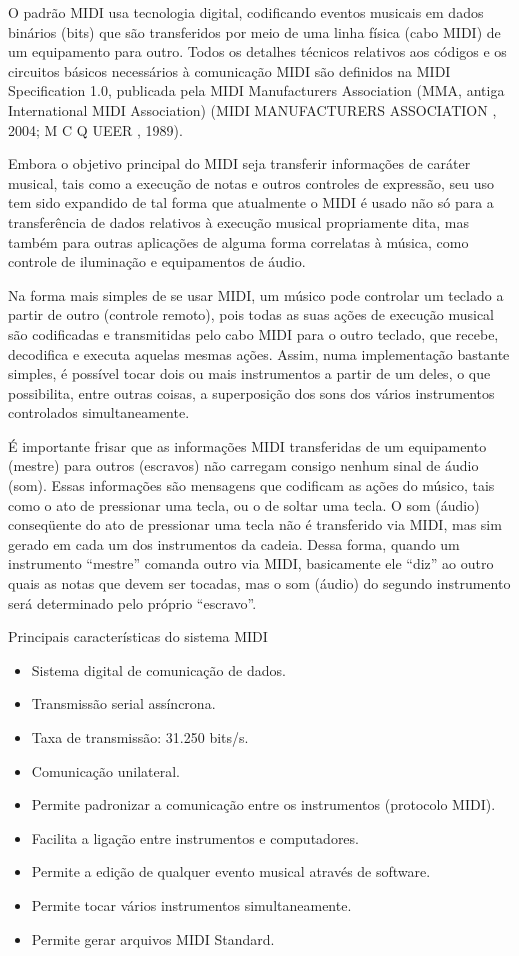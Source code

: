 O padrão MIDI usa tecnologia digital, codificando eventos musicais em dados binários (bits) que são transferidos por meio de uma linha física (cabo MIDI) de um equipamento para outro. Todos os detalhes técnicos relativos aos códigos e os circuitos básicos necessários à comunicação MIDI são definidos na MIDI Specification 1.0, publicada pela MIDI Manufacturers Association (MMA, antiga International MIDI Association) (MIDI MANUFACTURERS ASSOCIATION , 2004; M C Q UEER , 1989).

Embora o objetivo principal do MIDI seja transferir informações de caráter musical, tais como a execução de notas e outros controles de expressão, seu uso tem sido expandido de tal forma que atualmente o MIDI é usado não só para a transferência de dados relativos à execução musical propriamente dita, mas também para outras aplicações de alguma forma correlatas à música, como controle de iluminação e equipamentos de áudio.

Na forma mais simples de se usar MIDI, um músico pode controlar um teclado a partir de outro (controle remoto), pois todas as suas ações de execução musical são codificadas e transmitidas pelo cabo MIDI para o outro teclado, que recebe, decodifica e executa aquelas mesmas ações. Assim, numa implementação bastante simples, é possível tocar dois ou mais instrumentos a partir de um deles, o que possibilita, entre outras coisas, a superposição dos sons dos vários instrumentos controlados simultaneamente.

É importante frisar que as informações MIDI transferidas de um equipamento (mestre) para outros (escravos) não carregam consigo nenhum sinal de áudio (som). Essas informações são mensagens que codificam as ações do músico, tais como o ato de pressionar uma tecla, ou o de soltar uma tecla. O som (áudio) conseqüente do ato de pressionar uma tecla não é transferido via MIDI, mas sim gerado em cada um dos instrumentos da cadeia. Dessa forma, quando um instrumento “mestre” comanda outro via MIDI, basicamente ele “diz” ao outro quais as notas que devem ser tocadas, mas o som (áudio) do segundo instrumento será determinado pelo próprio “escravo”.

Principais características do sistema MIDI

\begin{itemize}
    \item Sistema digital de comunicação de dados.
    \item Transmissão serial assíncrona.
    \item Taxa de transmissão: 31.250 bits/s.
    \item Comunicação unilateral.
    \item Permite padronizar a comunicação entre os instrumentos (protocolo MIDI).
    \item Facilita a ligação entre instrumentos e computadores.
    \item Permite a edição de qualquer evento musical através de software.
    \item Permite tocar vários instrumentos simultaneamente.
    \item Permite gerar arquivos MIDI Standard.
\end{itemize}

